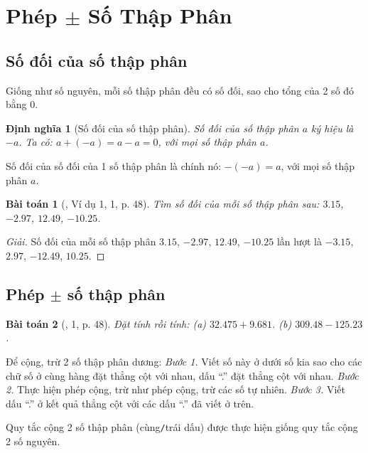 \documentclass{article}
\newtheorem{baitoan}{Bài toán}
\newtheorem{dinhnghia}{Định nghĩa}
\begin{document}
\section{Phép $\pm$ Số Thập Phân}

\subsection{Số đối của số thập phân}
Giống như số nguyên, mỗi số thập phân đều có số đối, sao cho tổng của 2 số đó bằng $0$.

\begin{dinhnghia}[Số đối của số thập phân]
	\emph{Số đối} của số thập phân $a$ ký hiệu là $-a$. Ta có: $a + (-a) = a - a = 0$, với mọi số thập phân $a$.
\end{dinhnghia}
Số đối của số đối của 1 số thập phân là chính nó: $-(-a) = a$, với mọi số thập phân $a$.

\begin{baitoan}[\cite{SGK_Toan_6_Canh_Dieu_tap_2}, Ví dụ 1, 1, p. 48]
	Tìm số đối của mỗi số thập phân sau: $3.15$, $-2.97$, $12.49$, $-10.25$.
\end{baitoan}

\begin{proof}[Giải]
	Số đối của mỗi số thập phân $3.15$, $-2.97$, $12.49$, $-10.25$ lần lượt là $-3.15$, $2.97$, $-12.49$, $10.25$.
\end{proof}

\subsection{Phép $\pm$ số thập phân}

\begin{baitoan}[\cite{SGK_Toan_6_Canh_Dieu_tap_2}, 1, p. 48]
	Đặt tính rồi tính: (a) $32.475 + 9.681$. (b) $309.48 - 125.23$.
\end{baitoan}
Để cộng, trừ 2 số thập phân dương: \textit{Bước 1.} Viết số này ở dưới số kia sao cho các chữ số ở cùng hàng đặt thẳng cột với nhau, dấu ``.'' đặt thẳng cột với nhau. \textit{Bước 2.} Thực hiện phép cộng, trừ như phép cộng, trừ các số tự nhiên. \textit{Bước 3.} Viết dấu ``.'' ở kết quả thẳng cột với các dấu ``.'' đã viết ở trên.

Quy tắc cộng 2 số thập phân (cùng\texttt{/}trái dấu) được thực hiện giống quy tắc cộng 2 số nguyên.
\end{document}
